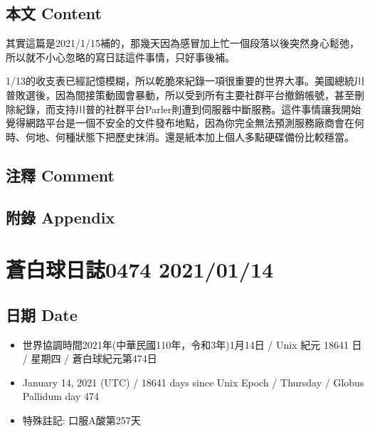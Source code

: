 \documentclass[a5paper, 11pt
]{book}
\providecommand{\tightlist}{%
  \setlength{\itemsep}{0pt}\setlength{\parskip}{0pt}}
\begin{document}
\hypertarget{ux672cux6587-content-43}{%
\subsection{本文 Content}\label{ux672cux6587-content-43}}

其實這篇是2021/1/15補的，那幾天因為感冒加上忙一個段落以後突然身心鬆弛，所以就不小心忽略的寫日誌這件事情，只好事後補。

1/13的收支表已經記憶模糊，所以乾脆來紀錄一項很重要的世界大事。美國總統川普敗選後，因為間接策動國會暴動，所以受到所有主要社群平台撤銷帳號，甚至刪除紀錄，而支持川普的社群平台Parler則遭到伺服器中斷服務。這件事情讓我開始覺得網路平台是一個不安全的文件發布地點，因為你完全無法預測服務廠商會在何時、何地、何種狀態下把歷史抹消。還是紙本加上個人多點硬碟備份比較穩當。

\hypertarget{ux6ce8ux91cb-comment-43}{%
\subsection{注釋 Comment}\label{ux6ce8ux91cb-comment-43}}

\hypertarget{ux9644ux9304-appendix-43}{%
\subsection{附錄 Appendix}\label{ux9644ux9304-appendix-43}}

\hypertarget{ux84bcux767dux7403ux65e5ux8a8c0474-20210114}{%
\section{蒼白球日誌0474
2021/01/14}\label{ux84bcux767dux7403ux65e5ux8a8c0474-20210114}}

\hypertarget{ux65e5ux671f-date-44}{%
\subsection{日期 Date}\label{ux65e5ux671f-date-44}}

\begin{itemize}
\tightlist
\item
  世界協調時間2021年(中華民國110年，令和3年)1月14日 / Unix 紀元 18641 日
  / 星期四 / 蒼白球紀元第474日
\item
  January 14, 2021 (UTC) / 18641 days since Unix Epoch / Thursday /
  Globus Pallidum day 474
\item
  特殊註記: 口服A酸第257天
\end{itemize}
\end{document}
